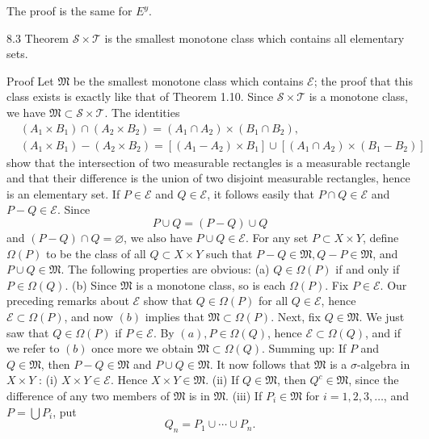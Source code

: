 The proof is the same for $E^y$.

8.3 Theorem $\mathscr{S} \times \mathscr{T}$ is the smallest monotone class which contains all elementary sets.

Proof Let $\mathfrak{M}$ be the smallest monotone class which contains $\mathscr{E}$; the proof that this class exists is exactly like that of Theorem 1.10. Since $\mathscr{S} \times \mathscr{T}$ is a monotone class, we have $\mathfrak{M} \subset \mathscr{S} \times \mathscr{T}$.
The identities
$$
\begin{aligned}
& \left(A_1 \times B_1\right) \cap\left(A_2 \times B_2\right)=\left(A_1 \cap A_2\right) \times\left(B_1 \cap B_2\right), \\
& \left(A_1 \times B_1\right)-\left(A_2 \times B_2\right)=\left[\left(A_1-A_2\right) \times B_1\right] \cup\left[\left(A_1 \cap A_2\right) \times\left(B_1-B_2\right)\right]
\end{aligned}
$$
show that the intersection of two measurable rectangles is a measurable rectangle and that their difference is the union of two disjoint measurable rectangles, hence is an elementary set. If $P \in \mathscr{E}$ and $Q \in \mathscr{E}$, it follows easily that $P \cap Q \in \mathscr{E}$ and $P-Q \in \mathscr{E}$. Since
$$
P \cup Q=(P-Q) \cup Q
$$
and $(P-Q) \cap Q=\varnothing$, we also have $P \cup Q \in \mathscr{E}$.
For any set $P \subset X \times Y$, define $\Omega(P)$ to be the class of all $Q \subset X \times Y$ such that $P-Q \in \mathfrak{M}, Q-P \in \mathfrak{M}$, and $P \cup Q \in \mathfrak{M}$. The following properties are obvious:
(a) $Q \in \Omega(P)$ if and only if $P \in \Omega(Q)$.
(b) Since $\mathfrak{M}$ is a monotone class, so is each $\Omega(P)$.
Fix $P \in \mathscr{E}$. Our preceding remarks about $\mathscr{E}$ show that $Q \in \Omega(P)$ for all $Q \in \mathscr{E}$, hence $\mathscr{E} \subset \Omega(P)$, and now $(b)$ implies that $\mathfrak{M} \subset \Omega(P)$.
Next, fix $Q \in \mathfrak{M}$. We just saw that $Q \in \Omega(P)$ if $P \in \mathscr{E}$. By $(a), P \in \Omega(Q)$, hence $\mathscr{E} \subset \Omega(Q)$, and if we refer to $(b)$ once more we obtain $\mathfrak{M} \subset \Omega(Q)$.
Summing up: If $P$ and $Q \in \mathfrak{M}$, then $P-Q \in \mathfrak{M}$ and $P \cup Q \in \mathfrak{M}$.
It now follows that $\mathfrak{M}$ is a $\sigma$-algebra in $X \times Y$ :
(i) $X \times Y \in \mathscr{E}$. Hence $X \times Y \in \mathfrak{M}$.
(ii) If $Q \in \mathfrak{M}$, then $Q^c \in \mathfrak{M}$, since the difference of any two members of $\mathfrak{M}$ is in $\mathfrak{M}$.
(iii) If $P_i \in \mathfrak{M}$ for $i=1,2,3, \ldots$, and $P=\bigcup P_i$, put
$$
Q_n=P_1 \cup \cdots \cup P_n .
$$

